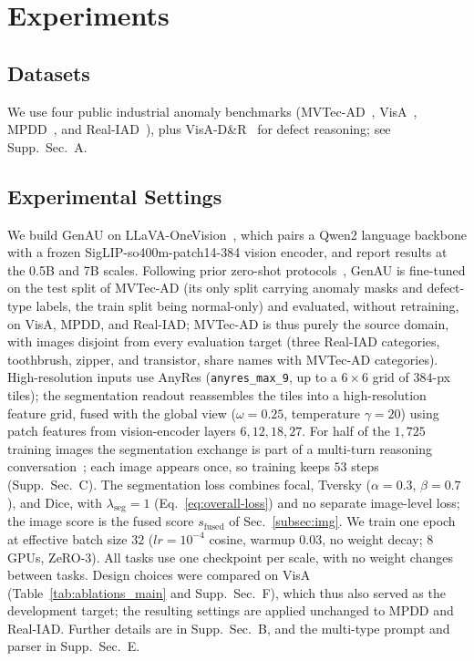 \section{Experiments}

\subsection{Datasets}
We use four public industrial anomaly benchmarks (MVTec-AD~\cite{Bergmann_2019_CVPR}, VisA~\cite{VisA}, MPDD~\cite{mpdd}, and Real-IAD~\cite{wang2024realiadrealworldmultiviewdataset}), plus VisA-D\&R~\cite{xu2025towards} for defect reasoning; see Supp.~Sec.~A.

\subsection{Experimental Settings}
We build GenAU on LLaVA-OneVision~\cite{li2025llavaonevision}, which pairs a Qwen2 language backbone with a frozen SigLIP-so400m-patch14-384 vision encoder, and report results at the 0.5B and 7B scales. Following prior zero-shot protocols~\cite{sadikaj2025multiadsdefectawaresupervisionmultitype, chen2023zero, zhou2024anomalyclip}, GenAU is fine-tuned on the test split of MVTec-AD (its only split carrying anomaly masks and defect-type labels, the train split being normal-only) and evaluated, without retraining, on VisA, MPDD, and Real-IAD; MVTec-AD is thus purely the source domain, with images disjoint from every evaluation target (three Real-IAD categories, toothbrush, zipper, and transistor, share names with MVTec-AD categories).
High-resolution inputs use AnyRes (\texttt{anyres\_max\_9}, up to a $6\times6$ grid of $384$-px tiles); the segmentation readout reassembles the tiles into a high-resolution feature grid, fused with the global view ($\omega=0.25$, temperature $\gamma=20$) using patch features from vision-encoder layers $6,12,18,27$. For half of the $1{,}725$ training images the segmentation exchange is part of a multi-turn reasoning conversation~\cite{xu2025towards}; each image appears once, so training keeps $53$ steps (Supp.~Sec.~C). The segmentation loss combines focal, Tversky ($\alpha=0.3$, $\beta=0.7$), and Dice, with $\lambda_{\mathrm{seg}}=1$ (Eq.~\ref{eq:overall-loss}) and no separate image-level loss; the image score is the fused score $s_{\mathrm{fused}}$ of Sec.~\ref{subsec:img}. We train one epoch at effective batch size $32$ ($lr=10^{-4}$ cosine, warmup $0.03$, no weight decay; $8$ GPUs, ZeRO-3). All tasks use one checkpoint per scale, with no weight changes between tasks. Design choices were compared on VisA (Table~\ref{tab:ablations_main} and Supp.~Sec.~F), which thus also served as the development target; the resulting settings are applied unchanged to MPDD and Real-IAD. Further details are in Supp.~Sec.~B, and the multi-type prompt and parser in Supp.~Sec.~E.

